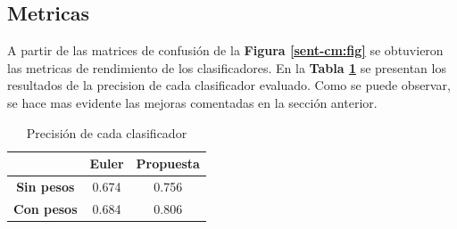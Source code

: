\documentclass[a4paper]{article}
\newcommand{\reffig}[1]{\textbf{Figura \ref{#1}}}
\newcommand{\reftable}[1]{\textbf{Tabla \ref{#1}}}
\begin{document}
\subsection{Metricas}
A partir de las matrices de confusión de la \reffig{sent-cm:fig} se obtuvieron las metricas de rendimiento de los clasificadores. En la \reftable{tab:sent-prec} se presentan los resultados de la precision de cada clasificador evaluado. Como se puede observar, se hace mas evidente las mejoras comentadas en la sección anterior.

\begin{table}[h]
  \centering
  \begin{tabular}{@{}ccc@{}}
    \toprule
    \multicolumn{1}{l}{} & \textbf{Euler} & \textbf{Propuesta} \\ \midrule
    \textbf{Sin pesos}   & 0.674          & 0.756              \\
    \textbf{Con pesos}   & 0.684          & 0.806              \\ \bottomrule
    \end{tabular}
  \caption{Precisión de cada clasificador}
  \label{tab:sent-prec}
  \end{table}
\end{document}
